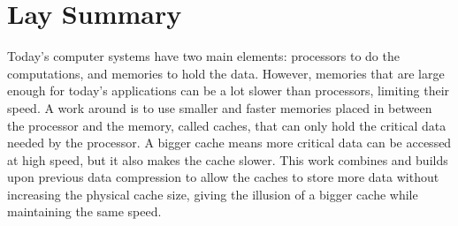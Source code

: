 
\chapter{Lay Summary}
Today's computer systems have two main elements: processors to do the computations, and memories to hold the data. However, memories that are large enough for today's applications can be a lot slower than processors, limiting their speed. A work around is to use smaller and faster memories placed in between the processor and the memory, called caches, that can only hold the critical data needed by the processor. A bigger cache means more critical data can be accessed at high speed, but it also makes the cache slower. This work combines and builds upon previous data compression to allow the caches to store more data without increasing the physical cache size, giving the illusion of a bigger cache while maintaining the same speed.
